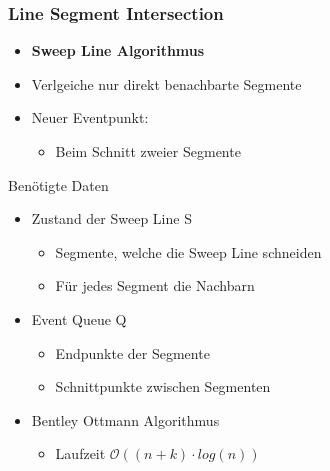 \begin{frame}
	\frametitle{{Line Segment Intersection}}
	\begin{itemize}
		\item \textbf{Sweep Line Algorithmus}
		\pause
		\item Verlgeiche nur direkt benachbarte Segmente
		\pause
		\item Neuer Eventpunkt:
		\begin{itemize}
			\pause
			\item Beim Schnitt zweier Segmente
		\end{itemize}
	\end{itemize}
	\pause
	\begin{block}{Ben\"otigte Daten}
		\begin{itemize}
			\item Zustand der Sweep Line S
			\begin{itemize}
				\item Segmente, welche die Sweep Line schneiden
				\pause
				\item F\"ur jedes Segment die Nachbarn
			\end{itemize}
			\pause
			\item Event Queue Q
			\begin{itemize}
				\item Endpunkte der Segmente
				\pause
				\item Schnittpunkte zwischen Segmenten
			\end{itemize}
		\end{itemize}
	\end{block}
	\pause
	\begin{itemize}
		\item Bentley Ottmann Algorithmus
		\begin{itemize}
			\item Laufzeit $\mathcal O((n+k)\cdot log(n))$
		\end{itemize}
	\end{itemize}
\end{frame}

